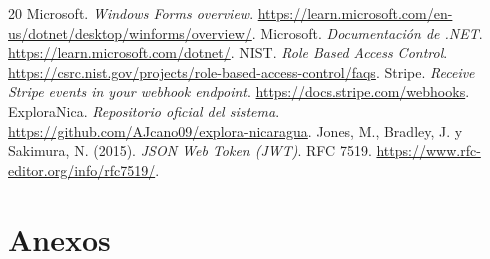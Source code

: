\begin{thebibliography}{20}
 Microsoft. \emph{Windows Forms overview}. \url{https://learn.microsoft.com/en-us/dotnet/desktop/winforms/overview/}.
 Microsoft. \emph{Documentación de .NET}. \url{https://learn.microsoft.com/dotnet/}.
 NIST. \emph{Role Based Access Control}. \url{https://csrc.nist.gov/projects/role-based-access-control/faqs}.
 Stripe. \emph{Receive Stripe events in your webhook endpoint}. \url{https://docs.stripe.com/webhooks}.
 ExploraNica. \emph{Repositorio oficial del sistema}. \url{https://github.com/AJcano09/explora-nicaragua}.
 Jones, M., Bradley, J. y Sakimura, N. (2015). \emph{JSON Web Token (JWT)}. RFC 7519. \url{https://www.rfc-editor.org/info/rfc7519/}.
\end{thebibliography}
\endgroup

\section{Anexos}
